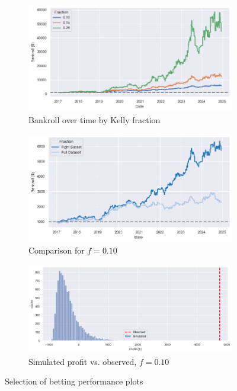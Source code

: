 \documentclass[12pt,twoside]{report}
\begin{document}
\begin{figure}[!htb]
\centering
\captionsetup{justification=centering}
\begin{subfigure}{.5\linewidth}
  \centering
  \includegraphics[width=\linewidth]{figures/bankroll_lr_case_study_simultaneous.png}
  \caption{Bankroll over time by Kelly fraction}
\end{subfigure}%
\begin{subfigure}{.5\linewidth}
  \centering
  \includegraphics[width=\linewidth]{figures/bankroll_comparison.png}
  \caption{Comparison for $f = 0.10$}
\end{subfigure}
\begin{subfigure}{.7\linewidth}
  \centering
  \includegraphics[width=\linewidth]{figures/mc_results_case_study.png}
  \caption{Simulated profit vs. observed, $f = 0.10$}
\end{subfigure}
\caption{Selection of betting performance plots}
\end{figure}
\end{document}
